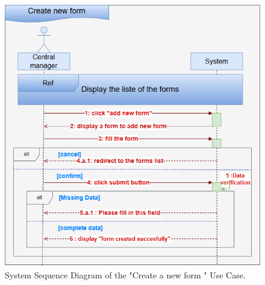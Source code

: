 \clearpage
\begin{figure}[h!]
    \centering
    \includegraphics[width=1\textwidth]{figures/seqcreate a form..png}
    \caption{System Sequence Diagram of the "Create a new form " Use Case.}
\end{figure}
\clearpage


